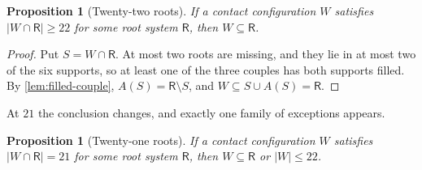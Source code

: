 \documentclass[11pt,reqno]{amsart}
\renewcommand{\_}{\origunderscore\allowbreak}
\numberwithin{equation}{section}
\theoremstyle{plain}
\newtheorem{prop}[thm]{Proposition}
\theoremstyle{definition}
\theoremstyle{remark}
\newcommand{\Rt}{\mathsf{R}}                 %
\begin{document}
\begin{prop}[Twenty-two roots]\label{prop:meet22}
If a contact configuration $W$ satisfies $|W\cap\Rt|\ge22$ for some root
system $\Rt$, then $W\subseteq\Rt$.
\end{prop}

\begin{proof}
Put $S=W\cap\Rt$. At most two roots are missing, and they lie in at most
two of the six supports, so at least one of the three couples has both
supports filled. By \cref{lem:filled-couple}, $A(S)=\Rt\setminus S$, and
$W\subseteq S\cup A(S)=\Rt$.
\end{proof}

At $21$ the conclusion changes, and exactly one family of exceptions
appears.

\begin{prop}[Twenty-one roots]\label{prop:meet21}
If a contact configuration $W$ satisfies $|W\cap\Rt|=21$ for some root
system $\Rt$, then $W\subseteq\Rt$ or $|W|\le22$.
\end{prop}
\end{document}
